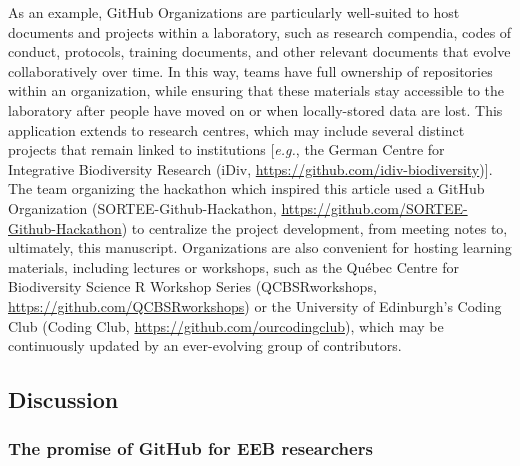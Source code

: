 As an example, GitHub Organizations are particularly well-suited to host documents and projects within a laboratory, such as research compendia, codes of conduct, protocols, training documents, and other relevant documents that evolve collaboratively over time.
In this way, teams have full ownership of repositories within an organization, while ensuring that these materials stay accessible to the laboratory after people have moved on or when locally-stored data are lost.
This application extends to research centres, which may include several distinct projects that remain linked to institutions {[}\emph{e.g.}, the German Centre for Integrative Biodiversity Research (iDiv, \url{https://github.com/idiv-biodiversity}){]}.
The team organizing the hackathon which inspired this article used a GitHub Organization (SORTEE-Github-Hackathon, \url{https://github.com/SORTEE-Github-Hackathon}) to centralize the project development, from meeting notes to, ultimately, this manuscript.
Organizations are also convenient for hosting learning materials, including lectures or workshops, such as the Québec Centre for Biodiversity Science R Workshop Series (QCBSRworkshops, \url{https://github.com/QCBSRworkshops}) or the University of Edinburgh's Coding Club (Coding Club, \url{https://github.com/ourcodingclub}), which may be continuously updated by an ever-evolving group of contributors.

\hypertarget{discussion}{%
\subsection{Discussion}\label{discussion}}

\hypertarget{the-promise-of-github-for-eeb-researchers}{%
\subsubsection{The promise of GitHub for EEB researchers}\label{the-promise-of-github-for-eeb-researchers}}

